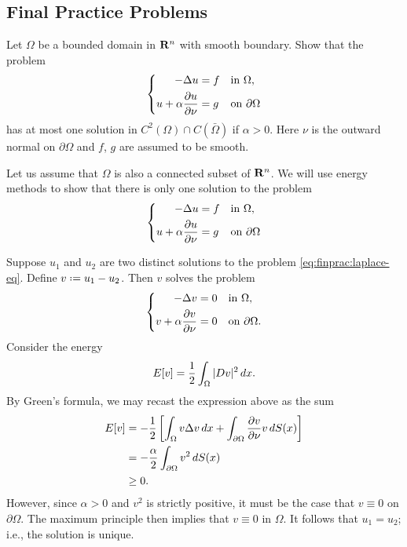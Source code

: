 \subsection{Final Practice Problems}
\begin{problem}
  Let \(\Omega\) be a bounded domain in \(\mathbf{R}^n\) with smooth boundary. Show
  that the problem
  \[
    \left\{
      \begin{aligned}
        -\Delta u&=f&&\text{in \(\Omega\),}\\
        u+\alpha\frac{\partial u}{\partial\nu}&=g&&\text{on \(\partial\Omega\)}
      \end{aligned}
    \right.
  \]
  has at most one solution in \(C^2(\Omega)\cap C(\bar\Omega)\) if
  \(\alpha>0\). Here \(\nu\) is the outward normal on \(\partial\Omega\)
  and \(f\), \(g\) are assumed to be smooth.
\end{problem}
\begin{solution*}
  Let us assume that \(\Omega\) is also a connected subset of \(\mathbf{R}^n\). We
  will use energy methods to show that there is only one solution to the
  problem
  \begin{equation}
    \label{eq:finprac:laplace-eq}
    \left\{
      \begin{aligned}
        -\Delta u&=f&&\text{in \(\Omega\),}\\
        u+\alpha\frac{\partial u}{\partial\nu}&=g&&\text{on \(\partial\Omega\)}
      \end{aligned}
    \right.
  \end{equation}

  Suppose \(u_1\) and \(u_2\) are two distinct solutions to the problem
  \eqref{eq:finprac:laplace-eq}. Define \(v\defeq u_1-u_2\). Then \(v\)
  solves the problem
  \[
    \left\{
      \begin{aligned}
        -\Delta v&=0&&\text{in \(\Omega\),}\\
        v+\alpha\frac{\partial v}{\partial\nu}&=0&&\text{on \(\partial\Omega\).}
      \end{aligned}
    \right.
  \]
  Consider the energy
  \[
    E[v]=\frac{1}{2}\int_\Omega|Dv|^2\mathop{}\!d x.
  \]
  By Green's formula, we may recast the expression above as the sum
  \begin{align*}
    E[v]
    &=-\frac{1}{2}
      \left[%
      \int_\Omega v\Lap v\diff x%
      +\int_{\partial\Omega}\frac{\partial v}{\partial\nu }v\diff S(x)%
      \right]\\
    &=-\frac{\alpha}{2}\int_{\partial\Omega} v^2\diff S(x)\\
    &\geq 0.
  \end{align*}
  However, since \(\alpha>0\) and \(v^2\) is strictly positive, it must be
  the case that \(v\equiv 0\) on \(\partial\Omega\). The maximum principle
  then implies that \(v\equiv 0\) in \(\Omega\). It follows that
  \(u_1=u_2\); i.e., the solution is unique.
\end{solution*}

